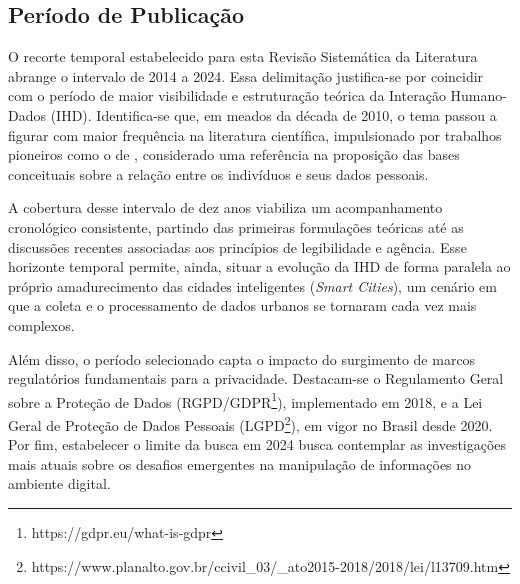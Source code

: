 \documentclass[
	12pt,				%
	oneside,			%
	a4paper,			%
	english,			%
	brazil				%
	]{abntex2ppgsi}
\begin{document}



\subsection{Período de Publicação}


    O recorte temporal estabelecido para esta Revisão Sistemática da Literatura abrange o intervalo de 2014 a 2024. Essa delimitação justifica-se por coincidir com o período de maior visibilidade e estruturação teórica da Interação Humano-Dados (IHD). Identifica-se que, em meados da década de 2010, o tema passou a figurar com maior frequência na literatura científica, impulsionado por trabalhos pioneiros como o de , considerado uma referência na proposição das bases conceituais sobre a relação entre os indivíduos e seus dados pessoais.

    A cobertura desse intervalo de dez anos viabiliza um acompanhamento cronológico consistente, partindo das primeiras formulações teóricas até as discussões recentes associadas aos princípios de legibilidade e agência. Esse horizonte temporal permite, ainda, situar a evolução da IHD de forma paralela ao próprio amadurecimento das cidades inteligentes (\textit{Smart Cities}), um cenário em que a coleta e o processamento de dados urbanos se tornaram cada vez mais complexos.

   Além disso, o período selecionado capta o impacto do surgimento de marcos regulatórios fundamentais para a privacidade. Destacam-se o Regulamento Geral sobre a Proteção de Dados (RGPD/GDPR\footnote{https://gdpr.eu/what-is-gdpr}), implementado em 2018, e a Lei Geral de Proteção de Dados Pessoais (LGPD\footnote{https://www.planalto.gov.br/ccivil\_03/\_ato2015-2018/2018/lei/l13709.htm}), em vigor no Brasil desde 2020. Por fim, estabelecer o limite da busca em 2024 busca contemplar as investigações mais atuais sobre os desafios emergentes na manipulação de informações no ambiente digital.
\end{document}
